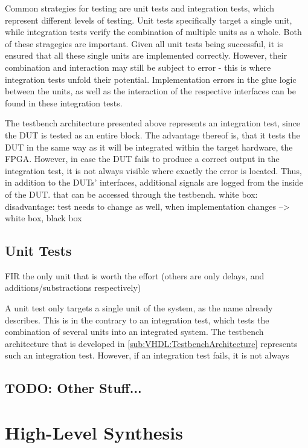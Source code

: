 Common strategies for testing are unit tests and integration tests, which represent different levels of testing.
Unit tests specifically target a single unit, while integration tests verify the combination of multiple units as a whole.
Both of these stragegies are important.
Given all unit tests being successful, it is ensured that all these single units are implemented correctly.
However, their combination and interaction may still be subject to error - this is where integration tests unfold their potential.
Implementation errors in the glue logic between the units, as well as the interaction of the respective interfaces can be found in these integration tests.

The testbench architecture presented above represents an integration test, since the DUT is tested as an entire block.
The advantage thereof is, that it tests the DUT in the same way as it will be integrated within the target hardware, the FPGA.
However, in case the DUT fails to produce a correct output in the integration test, it is not always visible where exactly the error is located.
Thus, in addition to the DUTs' interfaces, additional signals are logged from the inside of the DUT. that can be accessed through the testbench. white box: disadvantage: test needs to change as well, when implementation changes
--> white box, black box

\subsection{Unit Tests}
FIR the only unit that is worth the effort (others are only delays, and additions/substractions respectively)

A unit test only targets a single unit of the system, as the name already describes.
This is in the contrary to an integration test, which tests the combination of several units into an integrated system.
The testbench architecture that is developed in \ref{sub:VHDL:TestbenchArchitecture} represents such an integration test.
However, if an integration test fails, it is not always

\subsection{TODO: Other Stuff...}


\section{High-Level Synthesis}

